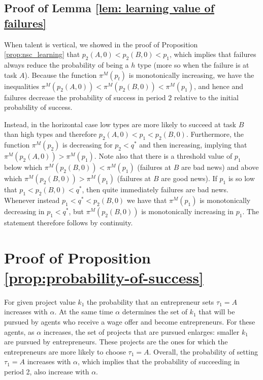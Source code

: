 \documentclass[12pt,american]{paper}
\theoremstyle{remark}
\begin{document}
\subsection*{Proof of Lemma \ref{lem: learning value of failures}}



When talent is vertical, we showed in the proof of Proposition \ref{prop:nsc_learning}  that $p_2(A,0)<p_2(B,0)<p_1$, which implies that failures always reduce the probability of being a $h$ type (more so when the failure is at task $A$). Because the function $\pi^M(p_t)$ is monotonically increasing, we have the inequalities $\pi^M(p_2(A,0))<\pi^M(p_2(B,0))<\pi^M(p_1)$, and hence and failures decrease the probability of success in period 2 relative to the initial probability of success.

 
Instead, in the horizontal case low types are more likely to succeed at task $B$ than high types and therefore $ p_2(A,0)<p_1<p_2(B,0)$. Furthermore, the function $\pi^M(p_2)$ is decreasing for $p_2<q^*$ and then increasing, implying that  $\pi^M(p_2(A,0))>\pi^M(p_1)$. Note also that there is a threshold value of $p_1$ below which $\pi^M(p_2(B,0))<\pi^M(p_1)$ (failures at $B$ are bad news) and above which  $\pi^M(p_2(B,0))>\pi^M(p_1)$ (failures at $B$ are good news). If $p_1$ is so low that  $p_1<p_2(B,0)<q^*$, then quite immediately failures are bad news. Whenever instead  $p_1<q^*<p_2(B,0)$ we have that $\pi^M(p_1)$ is monotonically decreasing in $p_1<q^*$, but $\pi^M(p_2(B,0))$ is monotonically increasing in $p_1$. The statement therefore follows by continuity.


\section*{Proof of Proposition \ref{prop:probability-of-success}}

 For given project value $k_1$ the probability that an entrepreneur sets $\tau_1=A$ increases with $\alpha$. At the same time $\alpha$ determines the set of $k_1$ that will be pursued by agents who receive a wage offer and become entrepreneurs.  For these agents, as $\alpha$ increases, the set of projects that are pursued enlarges: smaller $k_1$ are pursued by entrepreneurs. These projects are the ones for which the entrepreneurs are more likely to choose $\tau_1 =A$. Overall, the probability of setting $\tau_1=A$ increases with $\alpha$, which implies that the probability of succeeding in period 2, also increase with $\alpha$. 
 
\end{document}
